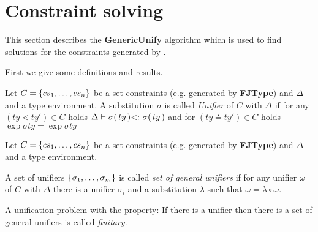 \clearpage
\section{Constraint solving}
\label{sec:unify}

This section describes the \textbf{GenericUnify} algorithm
which is used to find solutions for the constraints generated by \fjtype.

\color{red}
First we give some definitions and results.

\begin{definition}[Unifier]
  Let $C= \{ cs_1 , \ldots , cs_n \}$ be a set constraints (e.g. generated by
  \textbf{FJType}) and $\Delta$ and a type environment. A substitution $\sigma$
  is called \emph{Unifier} of $C$ with $\Delta$ if 
  for any $(ty \lessdot ty') \in C$ holds $\Delta \vdash \sigma(\,ty\,)
  \textrm{$<:$}\   \sigma(\,ty\,)$ and for $(ty \doteq ty') \in C$ holds $\exp{\sigma}{ty}
  =  \exp{\sigma}{ty}$
\end{definition}

\begin{definition}
  Let $C= \{ cs_1 , \ldots , cs_n \}$ be a set constraints (e.g. generated by
  \textbf{FJType}) and $\Delta$ and a type environment. 

  A set of unifiers $\{ \sigma_1 , \ldots , \sigma_m \}$ is called \emph{set of
    general unifiers} if for any unifier $\omega$ of $C$ with $\Delta$ there is
  a unifier $\sigma_i$ and a substitution $\lambda$ such that $\omega = \lambda
  \circ \omega$.
\end{definition}

\begin{definition}
A unification problem with the property: If there is a unifier then there is a set
of general unifiers is called \emph{finitary}.
\end{definition}




